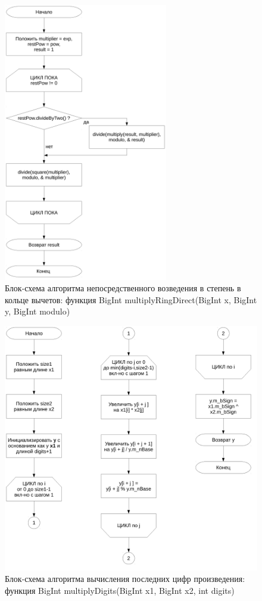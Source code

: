 \documentclass[a4paper,12pt]{article} %
\begin{document}
\begin{figure}[ht]
	\centering
	\includegraphics[width=0.64\textwidth]{lr5_raiseToPowerRingDirect.pdf}
	\caption{
		Блок-схема алгоритма непосредственного возведения в степень в кольце вычетов:
		функция BigInt multiplyRingDirect(BigInt x, BigInt y, BigInt modulo)
	}
	\label{bs_power_direct}
\end{figure}

\begin{figure}[ht]
	\centering
	\includegraphics[width=\textwidth]{lr5_multiplyDigits.pdf}
	\caption{
		Блок-схема алгоритма вычисления последних цифр произведения:
		функция BigInt multiplyDigits(BigInt x1, BigInt x2, int digits)
	}
	\label{bs_lr5_multiplyDigits}
\end{figure}
\end{document}
